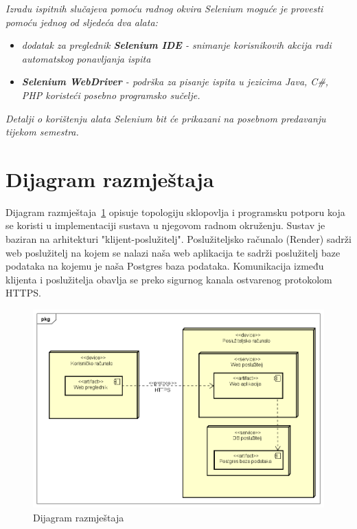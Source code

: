 			 \textit{Izradu ispitnih slučajeva pomoću radnog okvira Selenium moguće je provesti pomoću jednog od sljedeća dva alata:}
			 \begin{itemize}
			 	\item \textit{dodatak za preglednik \textbf{Selenium IDE} - snimanje korisnikovih akcija radi automatskog ponavljanja ispita	}
			 	\item \textit{\textbf{Selenium WebDriver} - podrška za pisanje ispita u jezicima Java, C\#, PHP koristeći posebno programsko sučelje.}
			 \end{itemize}
		 	\textit{Detalji o korištenju alata Selenium bit će prikazani na posebnom predavanju tijekom semestra.}
			
			\eject 
		
		
		\section{Dijagram razmještaja}
			
			Dijagram razmještaja~\ref{fig:dijagramRazmjestaja} opisuje topologiju sklopovlja i programsku potporu koja se koristi u implementaciji sustava u njegovom radnom okruženju. Sustav je baziran na arhitekturi "klijent-poslužitelj". Poslužiteljsko računalo (Render) sadrži web poslužitelj na kojem se nalazi naša web aplikacija te sadrži poslužitelj baze podataka na kojemu je naša Postgres baza podataka. Komunikacija između klijenta i poslužitelja obavlja se preko sigurnog kanala ostvarenog protokolom HTTPS.
			
			
			 \begin{figure}[H]
				\includegraphics[width=\textwidth]{slike/dijagramRazmjestaja.PNG} %
				\caption{Dijagram razmještaja}
				\label{fig:dijagramRazmjestaja} %
			\end{figure}
			
